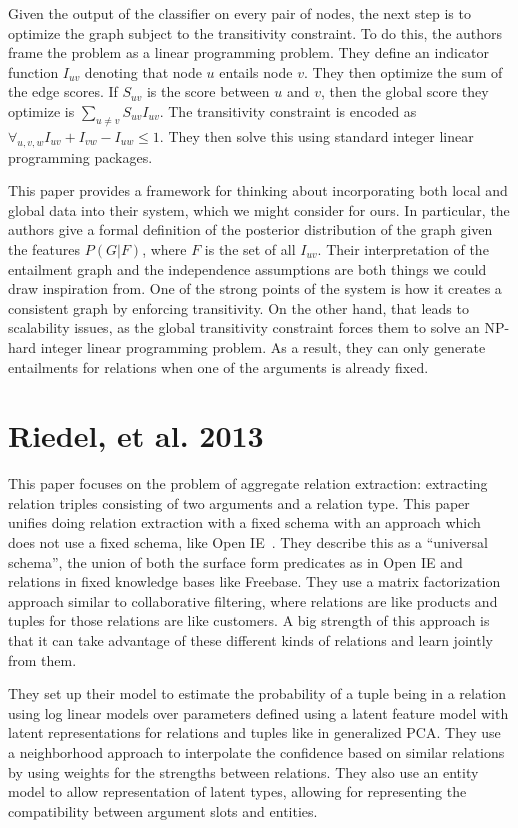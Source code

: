 \documentclass{article}
\begin{document}
Given the output of the classifier on every pair of nodes, the next step is to optimize the graph subject to the transitivity constraint. To do this, the authors frame the problem as a linear programming problem. They define an indicator function $I_{uv}$ denoting that node $u$ entails node $v$. They then optimize the sum of the edge scores. If $S_{uv}$ is the score between $u$ and $v$, then the global score they optimize is $\sum_{u \neq v} S_{uv}I_{uv}$. The transitivity constraint is encoded as $\forall_{u, v, w} I_{uv} + I_{vw} - I_{uw} \leq 1$. They then solve this using standard integer linear programming packages.

This paper provides a framework for thinking about incorporating both local and global data into their system, which we might consider for ours. In particular, the authors give a formal definition of the posterior distribution of the graph given the features $P(G|F)$, where $F$ is the set of all $I_{uv}$. Their interpretation of the entailment graph and the independence assumptions are both things we could draw inspiration from. One of the strong points of the system is how it creates a consistent graph by enforcing transitivity. On the other hand, that leads to scalability issues, as the global transitivity constraint forces them to solve an NP-hard integer linear programming problem. As a result, they can only generate entailments for relations when one of the arguments is already fixed.

\section*{Riedel, et al. 2013}

This paper focuses on the problem of aggregate relation extraction: extracting relation triples consisting of two arguments and a relation type. This paper unifies doing relation extraction with a fixed schema with an approach which does not use a fixed schema, like Open IE~\cite{Etzioni:2008:OIE:1409360.1409378}. They describe this as a ``universal schema'', the union of both the surface form predicates as in Open IE and relations in fixed knowledge bases like Freebase. They use a matrix factorization approach similar to collaborative filtering, where relations are like products and tuples for those relations are like customers. A big strength of this approach is that it can take advantage of these different kinds of relations and learn jointly from them.

They set up their model to estimate the probability of a tuple being in a relation using log linear models over parameters defined using a latent feature model with latent representations for relations and tuples like in generalized PCA. They use a neighborhood approach to interpolate the confidence based on similar relations by using weights for the strengths between relations. They also use an entity model to allow representation of latent types, allowing for representing the compatibility between argument slots and entities.
\end{document}
